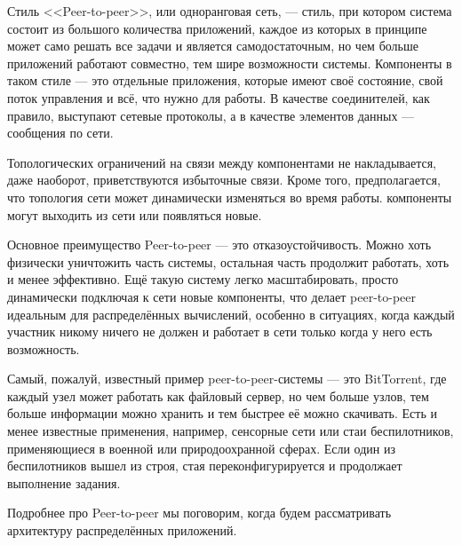 \documentclass[a5paper]{article}
\begin{document}
Стиль <<Peer-to-peer>>, или одноранговая сеть, --- стиль, при котором система состоит из большого количества приложений, каждое из которых в принципе может само решать все задачи и является самодостаточным, но чем больше приложений работают совместно, тем шире возможности системы. Компоненты в таком стиле --- это отдельные приложения, которые имеют своё состояние, свой поток управления и всё, что нужно для работы. В качестве соединителей, как правило, выступают сетевые протоколы, а в качестве элементов данных --- сообщения по сети. 

Топологических ограничений на связи между компонентами не накладывается, даже наоборот, приветствуются избыточные связи. Кроме того, предполагается, что топология сети может динамически изменяться во время работы. компоненты могут выходить из сети или появляться новые.

Основное преимущество Peer-to-peer --- это отказоустойчивость. Можно хоть физически уничтожить часть системы, остальная часть продолжит работать, хоть и менее эффективно. Ещё такую систему легко масштабировать, просто динамически подключая к сети новые компоненты, что делает peer-to-peer идеальным для распределённых вычислений, особенно в ситуациях, когда каждый участник никому ничего не должен и работает в сети только когда у него есть возможность.

Самый, пожалуй, известный пример peer-to-peer-системы --- это BitTorrent, где каждый узел может работать как файловый сервер, но чем больше узлов, тем больше информации можно хранить и тем быстрее её можно скачивать. Есть и менее известные применения, например, сенсорные сети или стаи беспилотников, применяющиеся в военной или природоохранной сферах. Если один из беспилотников вышел из строя, стая переконфигурируется и продолжает выполнение задания.

Подробнее про Peer-to-peer мы поговорим, когда будем рассматривать архитектуру распределённых приложений.
\end{document}
